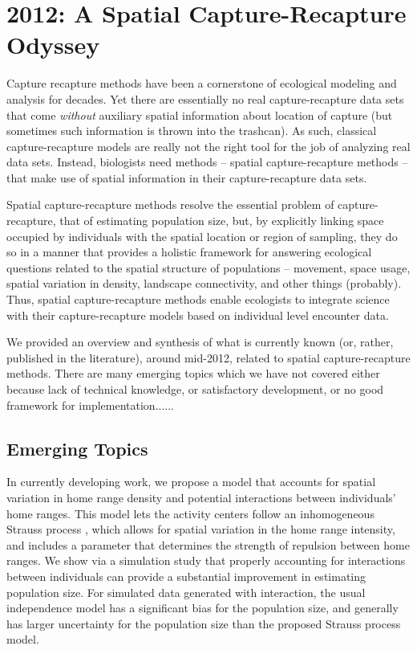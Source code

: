


\chapter{
 2012: A Spatial Capture-Recapture Odyssey
 }

\label{chapt.final}

\vspace{0.3cm}


\vspace{2in}

Capture recapture methods have been a cornerstone of ecological
modeling and analysis for decades.  Yet there are essentially no real
capture-recapture data sets that come {\it without} auxiliary spatial
information about location of capture (but sometimes such information
is thrown into the trashcan).  As such, classical capture-recapture
models are really not the right tool for the job of analyzing real
data sets. Instead, biologists need methods -- spatial
capture-recapture methods -- that make use of spatial
information in their capture-recapture data sets. 

Spatial capture-recapture methods resolve the essential problem of
capture-recapture, that of estimating population size, but, by
explicitly linking space occupied by individuals with the spatial
location or region of sampling, they do so in a manner that provides a
holistic framework for answering ecological questions related to the
spatial structure of populations -- movement, space usage, spatial
variation in density, landscape connectivity, and other things
(probably).  Thus, spatial capture-recapture methods enable ecologists
to integrate science with their capture-recapture models based on
individual level encounter data.

We provided an overview and synthesis of what is currently known (or,
rather, published in the literature),
around mid-2012, related to spatial capture-recapture methods. There
are many emerging topics which we have not covered either because lack
of technical knowledge, or satisfactory development, or no good
framework for implementation......

\section{Emerging Topics}


In currently developing work, we propose a model that accounts for
spatial variation in home range density and potential interactions
between individuals' home ranges.  This model lets the activity
centers follow an inhomogeneous Strauss process
\citep{strauss:1975,handbook:2010}, which allows for spatial variation
in the home range intensity, and includes a parameter that determines
the strength of repulsion between home ranges.  We show via a
simulation study that properly accounting for interactions between
individuals can provide a substantial improvement in estimating
population size.  For simulated data generated with interaction, the
usual independence model has a significant bias for the population
size, and generally has larger uncertainty for the population size
than the proposed Strauss process model.

